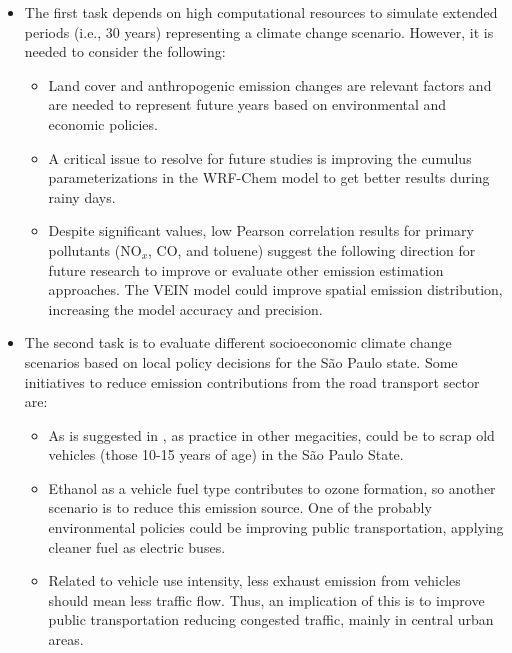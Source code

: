 \begin{itemize}
  \item The first task depends on high computational resources to simulate extended periods (i.e., 30 years) representing a climate change scenario. However, it is needed to consider the following:
  \begin{itemize}
  	\item Land cover and anthropogenic emission changes are relevant factors and are needed to represent future years based on environmental and economic policies.
  	\item A critical issue to resolve for future studies is improving the cumulus parameterizations in the WRF-Chem model to get better results during rainy days.
  	\item Despite significant values, low Pearson correlation results for primary pollutants (NO$_x$, CO, and toluene) suggest the following direction for future research to improve or evaluate other emission estimation approaches. The VEIN model \citep{Ibarra2018} could improve spatial emission distribution, increasing the model accuracy and precision.
  \end{itemize}

  \item The second task is to evaluate different socioeconomic climate change scenarios based on local policy decisions for the S\~{a}o Paulo state.   Some initiatives to reduce emission contributions from the road transport sector are:
  \begin{itemize}
    \item As is suggested in \citet{Andrade2017}, as practice in other megacities, could be to scrap old vehicles (those 10-15 years of age) in the S\~{a}o Paulo State.
    \item Ethanol as a vehicle fuel type contributes to ozone formation, so another scenario is to reduce this emission source. One of the probably environmental policies could be improving public transportation, applying cleaner fuel as electric buses.
  	\item Related to vehicle use intensity, less exhaust emission from vehicles should mean less traffic flow. Thus, an implication of this is to improve public transportation reducing congested traffic, mainly in central urban areas.
\end{itemize}
 
\end{itemize}

